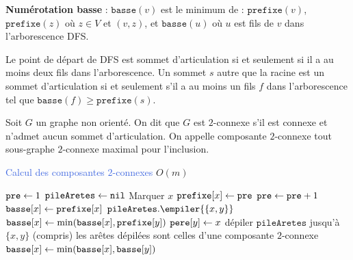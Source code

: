 \documentclass[a4paper,11pt,twocolumn]{article}
\begin{document}
	\begin{defn}
	\textbf{Numérotation basse} : $\texttt{basse}(v)$ est le minimum de : $\texttt{prefixe}(v)$, $\texttt{prefixe}(z)$ où $z \in V$ et $(v,z)$, et $\texttt{basse}(u)$ où $u$ est fils de $v$ dans l'arborescence DFS.
	\end{defn}

	\begin{thm}
	Le point de départ de DFS est sommet d'articulation si et seulement si il a au moins deux fils dans l'arborescence.
	Un sommet $s$ autre que la racine est un sommet d'articulation si et seulement s'il a au moins un fils $f$ dans l'arborescence tel que $\texttt{basse}(f) \geq \texttt{prefixe}(s)$.
	\end{thm}

	\begin{defn}
	Soit $G$ un graphe non orienté.
	On dit que $G$ est $2$-connexe s'il est connexe et n'admet aucun sommet d'articulation.
	On appelle composante $2$-connexe tout sous-graphe $2$-connexe maximal pour l'inclusion.
	\end{defn}

	\begin{algorithm}
	\caption{\textcolor{RoyalBlue}{Calcul des composantes $2$-connexes} $O(m)$}
	$\texttt{pre} \leftarrow 1$ \;
	$\texttt{pileAretes} \leftarrow \texttt{nil}$ \;
	{
		Marquer $x$ \;
		$\texttt{prefixe}[x] \leftarrow \texttt{pre}$ \;
		$\texttt{pre} \leftarrow \texttt{pre} + 1$ \;
		$\texttt{basse}[x] \leftarrow \texttt{prefixe}[x]$ \;
		{
			{
				$\texttt{pileAretes}.\empiler{ \{ x,y \} }$
				{
					$\texttt{basse}[x] \leftarrow \min(\texttt{basse}[x], \texttt{prefixe}[y])$ \;
				}
				\Sinon
				{
					$\texttt{pere}[y] \leftarrow x$ \;
					 \;
					{
						dépiler $\texttt{pileAretes}$ jusqu'à $\{ x,y \}$ (compris) \;
						les arêtes dépilées sont celles d'une composante $2$-connexe \;
					}
					\Sinon
					{
						$\texttt{basse}[x] \leftarrow \min(\texttt{basse}[x], \texttt{basse}[y])$ \;
					}
				}
			}
		}
	}
	\;
	\end{algorithm}
\end{document}
